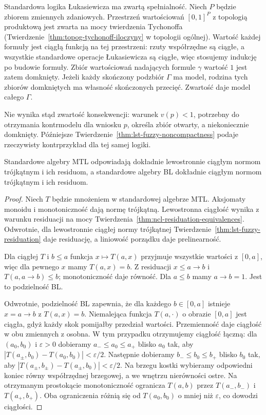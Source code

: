 \begin{przyklad}
\label{ex:ncl-satisfiability-compactness}
Standardowa logika Łukasiewicza ma zwartą spełnialność.
Niech $P$ będzie zbiorem zmiennych zdaniowych.
Przestrzeń wartościowań $[0,1]^P$ z topologią produktową
jest zwarta na mocy twierdzenia Tychonoffa
(Twierdzenie~\ref{thm:topog-tychonoff-iloczyny} w topologii ogólnej).
Wartość każdej formuły jest ciągłą funkcją na tej
przestrzeni: rzuty współrzędne są ciągłe, a wszystkie
standardowe operacje Łukasiewicza są ciągłe, więc
stosujemy indukcję po budowie formuły.
Zbiór wartościowań nadających formule $\gamma$
wartość $1$ jest zatem domknięty.
Jeżeli każdy skończony podzbiór $\Gamma$ ma model,
rodzina tych zbiorów domkniętych ma własność skończonych
przecięć. Zwartość daje model całego $\Gamma$.

Nie wynika stąd zwartość konsekwencji: warunek
$v(p)<1$, potrzebny do otrzymania kontrmodelu dla
wniosku $p$, określa zbiór otwarty, a niekoniecznie
domknięty. Późniejsze Twierdzenie~\ref{thm:lst-fuzzy-noncompactness}
podaje rzeczywisty kontrprzykład dla tej samej logiki.
\end{przyklad}

\begin{stwierdzenie}
\label{prop:lst-fuzzy-standard-chains}
Standardowe algebry MTL odpowiadają dokładnie lewostronnie
ciągłym normom trójkątnym i ich residuom, a standardowe
algebry BL dokładnie ciągłym normom trójkątnym i ich residuom.
\end{stwierdzenie}
\begin{proof}
Niech $T$ będzie mnożeniem w standardowej algebrze MTL.
Aksjomaty monoidu i monotoniczność dają normę trójkątną.
Lewostronna ciągłość wynika z warunku residuacji
na mocy Twierdzenia~\ref{thm:ncl-residuation-equivalences}.
Odwrotnie, dla lewostronnie ciągłej normy trójkątnej
Twierdzenie~\ref{thm:lst-fuzzy-residuation} daje residuację,
a liniowość porządku daje prelinearność.

Dla ciągłej $T$ i $b\leq a$ funkcja $x\mapsto T(a,x)$
przyjmuje wszystkie wartości z $[0,a]$, więc dla pewnego $x$
mamy $T(a,x)=b$. Z residuacji $x\leq a\to b$ i
$T(a,a\to b)\leq b$; monotoniczność daje równość.
Dla $a\leq b$ mamy $a\to b=1$. Jest to podzielność BL.

Odwrotnie, podzielność BL zapewnia, że dla każdego
$b\in[0,a]$ istnieje $x=a\to b$ z $T(a,x)=b$.
Niemalejąca funkcja $T(a,\cdot)$ o obrazie $[0,a]$
jest ciągła, gdyż każdy skok pomijałby przedział wartości.
Przemienność daje ciągłość w obu zmiennych z osobna.
W tym przypadku otrzymujemy ciągłość łączną: dla
$(a_0,b_0)$ i $\varepsilon>0$ dobieramy $a_-\leq a_0\leq a_+$
blisko $a_0$ tak, aby
$|T(a_\pm,b_0)-T(a_0,b_0)|<\varepsilon/2$.
Następnie dobieramy $b_-\leq b_0\leq b_+$ blisko $b_0$ tak,
aby $|T(a_\pm,b_\pm)-T(a_\pm,b_0)|<\varepsilon/2$.
Na brzegu kostki wybieramy odpowiedni koniec równy
współrzędnej brzegowej, a we wnętrzu nierówności ostre.
Na otrzymanym prostokącie monotoniczność ogranicza
$T(a,b)$ przez $T(a_-,b_-)$ i $T(a_+,b_+)$.
Oba ograniczenia różnią się od $T(a_0,b_0)$ o mniej niż
$\varepsilon$, co dowodzi ciągłości.
\end{proof}

